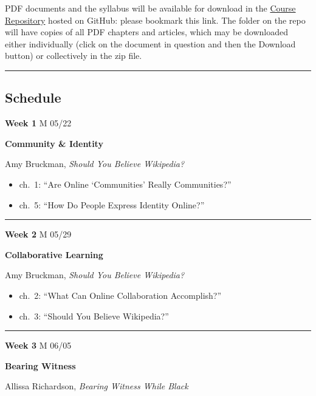 \documentclass[
  letterpaper,
  DIV=11,
  numbers=noendperiod]{scrartcl}
\providecommand{\tightlist}{%
  \setlength{\itemsep}{0pt}\setlength{\parskip}{0pt}}\usepackage{longtable,booktabs,array}
\begin{document}
PDF documents and the syllabus will be available for download in the
\href{https://github.com/mroberts1/social-media-theory-summer-2022}{Course
Repository} hosted on GitHub: please bookmark this link. The folder on
the repo will have copies of all PDF chapters and articles, which may be
downloaded either individually (click on the document in question and
then the Download button) or collectively in the zip file.

\begin{center}\rule{0.5\linewidth}{0.5pt}\end{center}

\hypertarget{schedule}{%
\subsection{Schedule}\label{schedule}}

\textbf{Week 1} M 05/22

\textbf{Community \& Identity}

Amy Bruckman, \emph{Should You Believe Wikipedia?}

\begin{itemize}
\tightlist
\item
  ch.~1: ``Are Online `Communities' Really Communities?''
\item
  ch.~5: ``How Do People Express Identity Online?''
\end{itemize}

\begin{center}\rule{0.5\linewidth}{0.5pt}\end{center}

\textbf{Week 2} M 05/29

\textbf{Collaborative Learning}

Amy Bruckman, \emph{Should You Believe Wikipedia?}

\begin{itemize}
\tightlist
\item
  ch.~2: ``What Can Online Collaboration Accomplish?''
\item
  ch.~3: ``Should You Believe Wikipedia?''
\end{itemize}

\begin{center}\rule{0.5\linewidth}{0.5pt}\end{center}

\textbf{Week 3} M 06/05

\textbf{Bearing Witness}

Allissa Richardson, \emph{Bearing Witness While Black}
\end{document}
